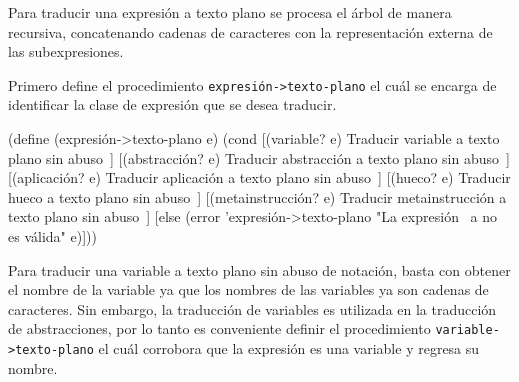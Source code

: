 \documentclass[letterpaper,twoside,openright,11pt]{book}
\begin{document}
Para traducir una expresión a texto plano se procesa el árbol de manera recursiva, concatenando cadenas de caracteres con la representación externa de las subexpresiones.

Primero define el procedimiento {\tt{}\protect{}\protect{}expresión->texto-plano} el cuál se encarga de identificar la clase de expresión que se desea traducir.

\nwenddocs{}\endmoddef
(define (expresión->texto-plano e)
  (cond
   [(variable? e)
    \LA{}Traducir variable a texto plano sin abuso~{\nwtagstyle{}}\RA{}]
   [(abstracción? e)
    \LA{}Traducir abstracción a texto plano sin abuso~{\nwtagstyle{}}\RA{}]
   [(aplicación? e)
    \LA{}Traducir aplicación a texto plano sin abuso~{\nwtagstyle{}}\RA{}]
   [(hueco? e)
    \LA{}Traducir hueco a texto plano sin abuso~{\nwtagstyle{}}\RA{}]
   [(metainstrucción? e)
    \LA{}Traducir metainstrucción a texto plano sin abuso~{\nwtagstyle{}}\RA{}]
   [else
    (error 'expresión->texto-plano
           "La expresión ~a no es válida" e)]))

\eatline
{}\nwendcode{}\nwdocspar

Para traducir una variable a texto plano sin abuso de notación, basta con obtener el nombre de la variable ya que los nombres de las variables ya son cadenas de caracteres. Sin embargo, la traducción de variables es utilizada en la traducción de abstracciones, por lo tanto es conveniente definir el procedimiento {\tt{}\protect{}variable\protect{}->texto-plano} el cuál corrobora que la expresión es una variable y regresa su nombre.
\end{document}
